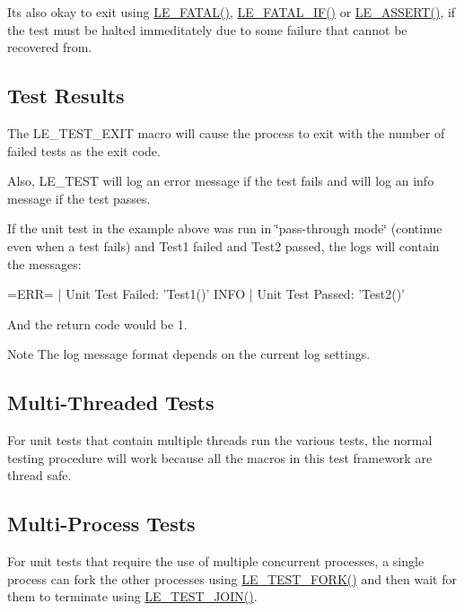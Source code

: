 It\textquotesingle{}s also okay to exit using \hyperlink{le__log_8h_a54b4b07f5396e19a8d9fca74238f4795}{L\+E\+\_\+\+F\+A\+T\+A\+L()}, \hyperlink{le__log_8h_a7a3e66a87026cc9e57bcb748840ab41b}{L\+E\+\_\+\+F\+A\+T\+A\+L\+\_\+\+I\+F()} or \hyperlink{le__log_8h_ac0dbbef91dc0fed449d0092ff0557b39}{L\+E\+\_\+\+A\+S\+S\+E\+R\+T()}, if the test must be halted immeditately due to some failure that cannot be recovered from.\hypertarget{c_test_c_test_result}{}\subsection{Test Results}\label{c_test_c_test_result}
The L\+E\+\_\+\+T\+E\+S\+T\+\_\+\+E\+X\+I\+T macro will cause the process to exit with the number of failed tests as the exit code.

Also, L\+E\+\_\+\+T\+E\+S\+T will log an error message if the test fails and will log an info message if the test passes.

If the unit test in the example above was run in \char`\"{}pass-\/through mode\char`\"{} (continue even when a test fails) and Test1 failed and Test2 passed, the logs will contain the messages\+:

\begin{DoxyVerb} =ERR= | Unit Test Failed: 'Test1()'
  INFO | Unit Test Passed: 'Test2()'
\end{DoxyVerb}


And the return code would be 1.

\begin{DoxyNote}{Note}
The log message format depends on the current log settings.
\end{DoxyNote}
\hypertarget{c_test_c_test_multiThread}{}\subsection{Multi-\/\+Threaded Tests}\label{c_test_c_test_multiThread}
For unit tests that contain multiple threads run the various tests, the normal testing procedure will work because all the macros in this test framework are thread safe.\hypertarget{c_test_c_test_multiProcess}{}\subsection{Multi-\/\+Process Tests}\label{c_test_c_test_multiProcess}
For unit tests that require the use of multiple concurrent processes, a single process can fork the other processes using \hyperlink{le__test_8h_ac0c538ca3dfcd072464385b2f7e2776f}{L\+E\+\_\+\+T\+E\+S\+T\+\_\+\+F\+O\+R\+K()} and then wait for them to terminate using \hyperlink{le__test_8h_ad6045dfae96da7c326024c784de3d207}{L\+E\+\_\+\+T\+E\+S\+T\+\_\+\+J\+O\+I\+N()}.

